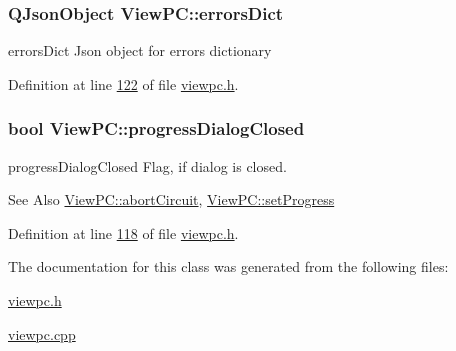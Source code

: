 \hypertarget{class_view_p_c_a26f90436aca32e5bad46f5e69a7e7e09}{
\subsubsection[{errors\-Dict}]{\setlength{\rightskip}{0pt plus 5cm}Q\-Json\-Object View\-P\-C\-::errors\-Dict}}\label{class_view_p_c_a26f90436aca32e5bad46f5e69a7e7e09}


errors\-Dict Json object for errors dictionary 



Definition at line \hyperlink{viewpc_8h_source_l00122}{122} of file \hyperlink{viewpc_8h_source}{viewpc.\-h}.

\hypertarget{class_view_p_c_add8c82aa2b0b934212aa5bde9277ab36}{
\subsubsection[{progress\-Dialog\-Closed}]{\setlength{\rightskip}{0pt plus 5cm}bool View\-P\-C\-::progress\-Dialog\-Closed}}\label{class_view_p_c_add8c82aa2b0b934212aa5bde9277ab36}


progress\-Dialog\-Closed Flag, if dialog is closed. 

\begin{DoxySeeAlso}{See Also}
\hyperlink{class_view_p_c_ad7ba2fcf1d17862de15e32432823f7b0}{View\-P\-C\-::abort\-Circuit}, \hyperlink{class_view_p_c_a9c32a1fdb6ead84e5ada8fba8860c7ed}{View\-P\-C\-::set\-Progress} 
\end{DoxySeeAlso}


Definition at line \hyperlink{viewpc_8h_source_l00118}{118} of file \hyperlink{viewpc_8h_source}{viewpc.\-h}.



The documentation for this class was generated from the following files\-:\begin{DoxyCompactItemize}
\item 
\hyperlink{viewpc_8h}{viewpc.\-h}\item 
\hyperlink{viewpc_8cpp}{viewpc.\-cpp}\end{DoxyCompactItemize}
